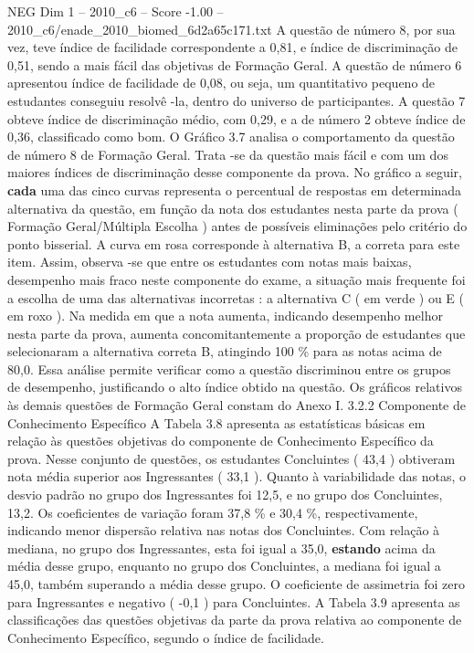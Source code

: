\begin{textsample}{NEG Dim 1 – 2010\_c6 – Score -1.00 – 2010\_c6/enade\_2010\_biomed\_6d2a65c171.txt}
A questão de número 8, por sua vez, teve índice de facilidade correspondente a 0,81, e índice de discriminação de 0,51, sendo a mais fácil das objetivas de Formação Geral.
A questão de número 6 apresentou índice de facilidade de 0,08, ou seja, um quantitativo pequeno de estudantes conseguiu resolvê -la, dentro do universo de participantes.
A questão 7 obteve índice de discriminação médio, com 0,29, e a de número 2 obteve índice de 0,36, classificado como bom.
O Gráfico 3.7 analisa o comportamento da questão de número 8 de Formação Geral.
Trata -se da questão mais fácil e com um dos maiores índices de discriminação desse componente da prova.
No gráfico a seguir, \textbf{cada} uma das cinco curvas representa o percentual de respostas em determinada alternativa da questão, em função da nota dos estudantes nesta parte da prova ( Formação Geral/Múltipla Escolha ) antes de possíveis eliminações pelo critério do ponto bisserial.
A curva em rosa corresponde à alternativa B, a correta para este item.
Assim, observa -se que entre os estudantes com notas mais baixas, desempenho mais fraco neste componente do exame, a situação mais frequente foi a escolha de uma das alternativas incorretas : a alternativa C ( em verde ) ou E ( em roxo ).
Na medida em que a nota aumenta, indicando desempenho melhor nesta parte da prova, aumenta concomitantemente a proporção de estudantes que selecionaram a alternativa correta B, atingindo 100 \% para as notas acima de 80,0.
Essa análise permite verificar como a questão discriminou entre os grupos de desempenho, justificando o alto índice obtido na questão.
Os gráficos relativos às demais questões de Formação Geral constam do Anexo I. 3.2.2 Componente de Conhecimento Específico A Tabela 3.8 apresenta as estatísticas básicas em relação às questões objetivas do componente de Conhecimento Específico da prova.
Nesse conjunto de questões, os estudantes Concluintes ( 43,4 ) obtiveram nota média superior aos Ingressantes ( 33,1 ).
Quanto à variabilidade das notas, o desvio padrão no grupo dos Ingressantes foi 12,5, e no grupo dos Concluintes, 13,2.
Os coeficientes de variação foram 37,8 \% e 30,4 \%, respectivamente, indicando menor dispersão relativa nas notas dos Concluintes.
Com relação à mediana, no grupo dos Ingressantes, esta foi igual a 35,0, \textbf{estando} acima da média desse grupo, enquanto no grupo dos Concluintes, a mediana foi igual a 45,0, também superando a média desse grupo.
O coeficiente de assimetria foi zero para Ingressantes e negativo ( -0,1 ) para Concluintes.
A Tabela 3.9 apresenta as classificações das questões objetivas da parte da prova relativa ao componente de Conhecimento Específico, segundo o índice de facilidade.

\end{textsample}
